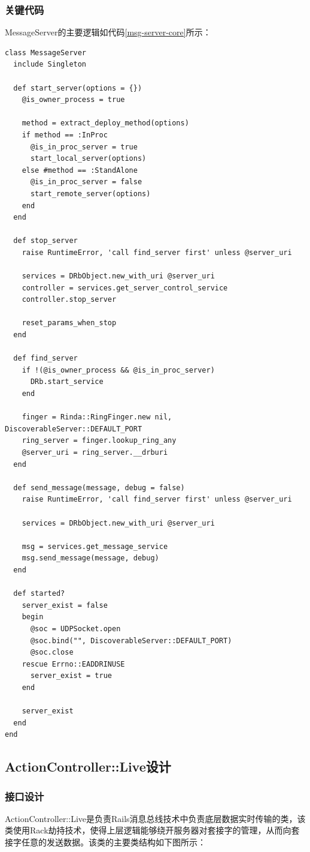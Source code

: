 \subsubsection{关键代码}
MessageServer的主要逻辑如代码\ref{msg-server-core}所示：
\begin{lstlisting}[caption={MessageServer核心代码展示}, label=msg-server-core]
class MessageServer
  include Singleton

  def start_server(options = {})
    @is_owner_process = true

    method = extract_deploy_method(options)
    if method == :InProc
      @is_in_proc_server = true
      start_local_server(options)
    else #method == :StandAlone
      @is_in_proc_server = false
      start_remote_server(options)
    end
  end

  def stop_server
    raise RuntimeError, 'call find_server first' unless @server_uri

    services = DRbObject.new_with_uri @server_uri
    controller = services.get_server_control_service
    controller.stop_server

    reset_params_when_stop
  end

  def find_server
    if !(@is_owner_process && @is_in_proc_server)
      DRb.start_service 
    end

    finger = Rinda::RingFinger.new nil, DiscoverableServer::DEFAULT_PORT
    ring_server = finger.lookup_ring_any
    @server_uri = ring_server.__drburi
  end

  def send_message(message, debug = false)
    raise RuntimeError, 'call find_server first' unless @server_uri

    services = DRbObject.new_with_uri @server_uri
    
    msg = services.get_message_service
    msg.send_message(message, debug)
  end

  def started?
    server_exist = false
    begin
      @soc = UDPSocket.open
      @soc.bind("", DiscoverableServer::DEFAULT_PORT)
      @soc.close
    rescue Errno::EADDRINUSE
      server_exist = true
    end

    server_exist
  end
end
\end{lstlisting}


\subsection{ActionController::Live设计}
\subsubsection{接口设计}
ActionController::Live是负责Rails消息总线技术中负责底层数据实时传输的类，该类使用Rack劫持技术，使得上层逻辑能够绕开服务器对套接字的管理，从而向套接字任意的发送数据。该类的主要类结构如下图所示：

